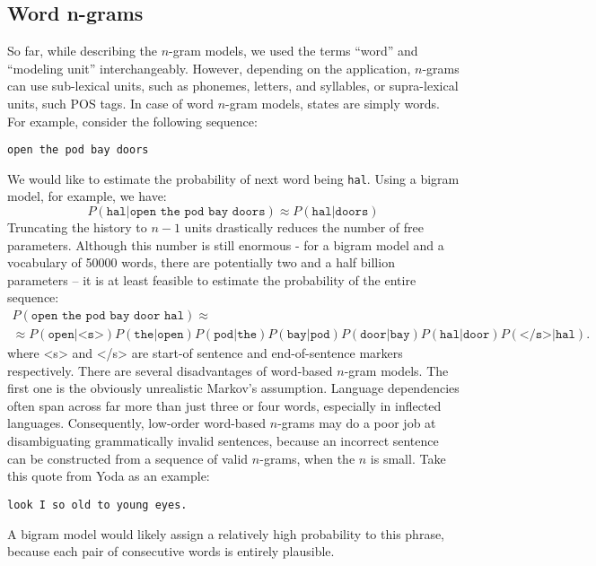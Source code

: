 \subsection{Word n-grams}
So far, while describing the $n$-gram models, we used the terms ``word'' and ``modeling unit'' interchangeably. However, depending on the application, $n$-grams can use sub-lexical units, such as phonemes, letters, and syllables, or supra-lexical units, such POS tags. In case of word $n$-gram models, states are simply words. For example, consider the following sequence:
\begin{center}
\texttt{open the pod bay doors}  
\end{center}
We would like to estimate the probability of next word being \texttt{hal}. Using a bigram model, for example, we have:
\begin{equation}
	P(\texttt{hal}|\texttt{open the pod bay doors}) \approx P(\texttt{hal}|\texttt{doors})
\end{equation}
Truncating the history to $n-1$ units drastically reduces the number of free parameters. Although this number is still enormous - for a bigram model and a vocabulary of 50000 words, there are potentially two and a half billion parameters -- it is at least feasible to estimate the probability of the entire sequence:
\begin{multline}
	P(\texttt{open the pod bay door hal}) \approx \\
	\approx P(\texttt{open}|\texttt{<s>})P(\texttt{the}|\texttt{open})P(\texttt{pod}|\texttt{the})P(\texttt{bay}|\texttt{pod})P(\texttt{door}|\texttt{bay})P(\texttt{hal}|\texttt{door})P(\texttt{</s>}|\texttt{hal}).
\end{multline}
where <s> and </s> are start-of sentence and end-of-sentence markers respectively.
There are several disadvantages of word-based $n$-gram models. The first one is the obviously unrealistic Markov's assumption. Language dependencies often span across far more than just three or four words, especially in inflected languages. Consequently, low-order word-based $n$-grams may do a poor job at disambiguating grammatically invalid sentences, because an incorrect sentence can be constructed from a sequence of valid $n$-grams, when the $n$ is small. Take this quote from Yoda as an example:
\begin{center}
	\texttt{look I so old to young eyes.}
\end{center}
A bigram model would likely assign a relatively high probability to this phrase, because each pair of consecutive words is entirely plausible. 
